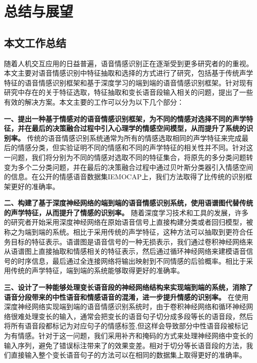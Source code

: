 \chapter{总结与展望}
\label{cha:summary_prospect}

\section{本文工作总结}
\label{sec:summary}

随着人机交互应用的日益普遍，语音情感识别正在逐渐受到更多研究者的的重视。本文主要对语音情感识别中特征抽取和选择的方式进行了研究，包括基于传统声学特征的语音情感识别框架和基于深度学习的端到端的语音情感识别框架。针对现有研究中存在的关于特征选取，特征抽取和变长语音段输入相关的问题，提出了一些有效的解决方案。本文主要的工作可以分为以下几个部分：

\textbf{一、提出一种基于情感对的语音情感识别框架，为不同的情感对选择不同的声学特征，并在最后的决策融合过程中引入心理学的情感空间模型，从而提升了系统的识别率。} 传统的语音情感识别系统通常为所有的情感选取相同的声学特征来完成最后的情感分类，但实验证明不同的情感和不同的声学特征的相关性并不同。针对这一问题，我们将分别为不同的情感对选取不同的特征集合，将原先的多分类问题转变为多个二分类问题，并在最后的决策融合过程中通过贝叶斯分类器引入情感空间的信息。在公开的情感语音数据集IEMOCAP上，我们方法取得了比传统的识别框架更好的准确率。

\textbf{二、构建了基于深度神经网络的端到端的语音情感识别系统，使用语谱图代替传统的声学特征，从而提升了情感的识别率。} 随着深度学习技术和工具的发展，许多的研究者开始采用深度神经网络在原始语音信号上直接构建分类或者回归模型，被称之为端到端的系统。相比于采用传统的声学特征，这种方法可以抽取到更符合任务目标的特征表示。语谱图是语音信号的一种无损表示，我们通过卷积神经网络来从语谱图上直接抽取和情感相关的特征表示，然后通过循环神经网络来建模语音信号的时序信息，最后通过全连接网络将输出映射到不同情感的后验概率。相比于采用传统的声学特征，端到端的系统能够取得更好的准确率。

\textbf{三、设计了一种能够处理变长语音段的神经网络结构来实现端到端的系统，消除了语音分段带来的中性语音和情感语音的混淆，进一步提升情感的识别率。} 在使用深度神经网络实现端到端的语音情感识别系统时，由于卷积神经网络和循环神经网络很难处理变长的输入，通常会把变长的语音句子切分成多段等长的语音段，然后将所有语音段都标记为对应句子的情感标签,但这样会导致部分中性语音段被标记为有情感。针对于这一问题，我们采用补齐和掩码的方式来处理神经网络中变长的输入序列，避免了错误标注带来了的效果变差。相对于切分等长语音段的方法，我们直接输入整个变长语音句子的方法可以在相同的数据集上取得更好的准确率。

